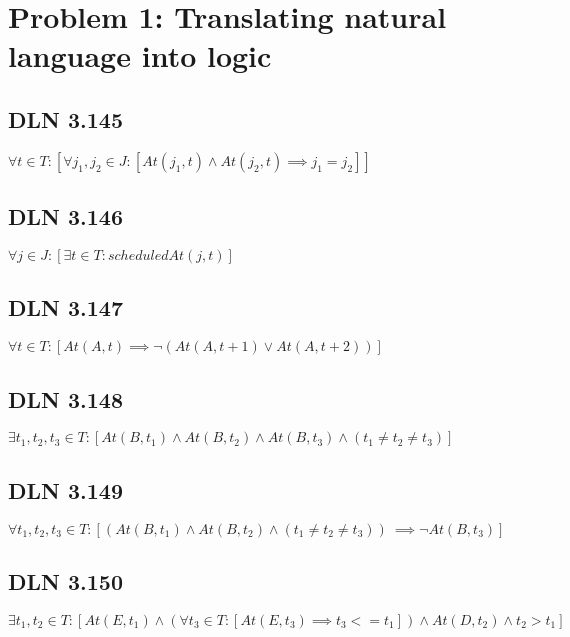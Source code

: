 \documentclass[titlepage]{article}
\begin{document}
 \maketitle

\section{Problem 1: Translating natural language into logic}


\subsection{DLN 3.145} 

\( \forall t \in T: [ \forall j_1, j_2 \in J :[At(j_1, t) \land At(j_2, t) \implies j_1 = j_2 ] ]\)

\subsection{DLN 3.146} 

\( \forall j \in J:[ \exists t \in T: scheduledAt(j,t)] \)

\subsection{DLN 3.147} 

\( \forall t \in T:[ At(A, t) \implies \lnot (At(A, t +1) \lor At(A, t+2))] \)

\subsection{DLN 3.148} 

\( \exists t_1, t_2, t_3 \in T:[At(B, t_1) \land At(B, t_2) \land At(B, t_3) \land (t_1 \neq t_2 \neq t_3)] \)

\subsection{DLN 3.149} 

\( \forall t_1, t_2, t_3 \in T: [(At(B, t_1) \land At(B, t_2) \land (t_1 \neq t_2 \neq t_3)) \ \implies \lnot At(B, t_3)] \)

\subsection{DLN 3.150} 

\(  \exists t_1,t_2 \in T:[At(E, t_1) \land (\forall t_3 \in T:[At(E, t_3) \implies t_3 <= t_1]) \land At(D, t_2) \land t_2 > t_1]\)
\end{document}
